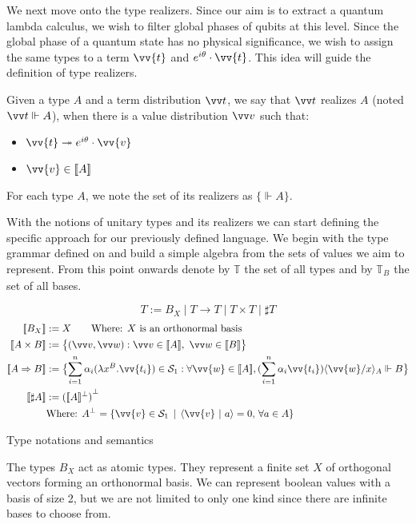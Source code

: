 \documentclass[runningheads,orivec,envcountsame,envcountsect]{llncs}
\newcommand\comp[2][]{#2^{\bot^{#1}}}
\newcommand\ansubst[2]{\ensuremath{\langle #1 \rangle_{#2}}}
\def\Sph{\mathcal{S}_1}       %
\def\scal#1#2{\langle{#1}~|~{#2}\rangle}
\def\Lam#1#2#3{\lambda#1^{#2}{.}#3} %
\def\Arr{\Rightarrow}
\def\Type{\mathbb{T}}
\def\BasisType{\Type_{\basis{}}}
\def\sem#1{\llbracket#1\rrbracket}
\def\real{\Vdash}
\newcommand\basis[1]{\ensuremath{B_{ #1 }}}
\begin{document}
We next move onto the type realizers. Since our aim is to extract a quantum lambda calculus, we wish to filter global phases of qubits at this level. Since the global phase of a quantum state has no physical significance, we wish to assign the same types to a term $\vv{t}$ and $e^{i\theta}\cdot\vv{t}$. This idea will guide the definition of type realizers.

\begin{definition}
  Given a type $A$ and a term distribution $\vv t$, we say that $\vv t$ realizes $A$ (noted $\vv t \real A$), when there is a value distribution $\vv v$ such that:
  \begin{itemize}
    \item $\vv{t}\twoheadrightarrow e^{i\theta}\cdot\vv{v}$
    \item $\vv{v}\in\sem{A}$
  \end{itemize}
  For each type $A$, we note the set of its realizers as $\{\real A\}$.
\end{definition}

With the notions of unitary types and its realizers we can start defining the specific approach for our previously defined language. We begin with the type grammar defined on  and build a simple algebra from the sets of values we aim to represent. From this point onwards denote by $\Type$ the set of all types and by $\BasisType$ the set of all bases.

\begin{table}[tb]
  \scriptsize
    \[
    T := \basis{X} \mid T\to T \mid T\times T \mid \sharp T
    \]
    \begin{align*}
    \sem{\basis{X}}&:= X\qquad\text{Where: $X$ is an orthonormal basis}\\
    \sem{A\times B}&:= \bigl\{ (\vv v, \vv w): \vv v \in{\sem{A}},~\vv w\in\sem{B}\bigr\}\\
    \sem{A\Arr B}&:=
    \bigl\{\sum_{i=1}^{n}\alpha_i(\Lam{x}{B}{\vv{t_i}})\in\Sph:\forall\vv{w}\in\sem{A}, (\sum_{i=1}^{n}\alpha_i \vv{t_i})\ansubst{\vv{w}/x}{A}\real B\bigr\}\\
    \sem{\sharp{A}}&:= {(\sem{A}^\bot)}^\bot\\
    &\text{Where: }\comp{A} = \{ \vv{v}\in \Sph \,\mid\, \scal{\vv{v}}{a} = 0,\, \forall a\in A\}
  \end{align*}
  \caption{Type notations and semantics}
  \label{tab:UnitaryTypes}
\end{table}

The types $\basis{X}$ act as atomic types. They represent a finite set $X$ of orthogonal vectors forming an orthonormal basis. We can represent boolean values with a basis of size 2, but we are not limited to only one kind since there are infinite bases to choose from.
\end{document}
